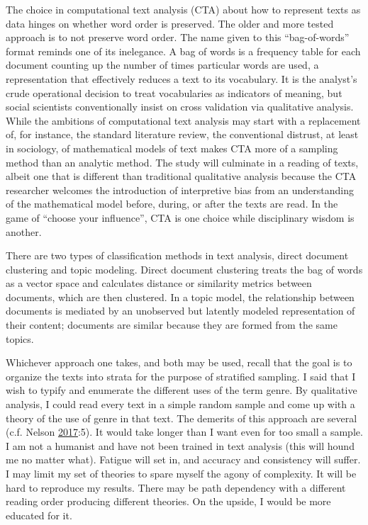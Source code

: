 \documentclass[]{book}
\theoremstyle{definition}
\theoremstyle{definition}
\theoremstyle{definition}
\theoremstyle{remark}
\begin{document}
The choice in computational text analysis (CTA) about how to represent
texts as data hinges on whether word order is preserved. The older and
more tested approach is to not preserve word order. The name given to
this ``bag-of-words'' format reminds one of its inelegance. A bag of
words is a frequency table for each document counting up the number of
times particular words are used, a representation that effectively
reduces a text to its vocabulary. It is the analyst's crude operational
decision to treat vocabularies as indicators of meaning, but social
scientists conventionally insist on cross validation via qualitative
analysis. While the ambitions of computational text analysis may start
with a replacement of, for instance, the standard literature review, the
conventional distrust, at least in sociology, of mathematical models of
text makes CTA more of a sampling method than an analytic method. The
study will culminate in a reading of texts, albeit one that is different
than traditional qualitative analysis because the CTA researcher
welcomes the introduction of interpretive bias from an understanding of
the mathematical model before, during, or after the texts are read. In
the game of ``choose your influence'', CTA is one choice while
disciplinary wisdom is another.

There are two types of classification methods in text analysis, direct
document clustering and topic modeling. Direct document clustering
treats the bag of words as a vector space and calculates distance or
similarity metrics between documents, which are then clustered. In a
topic model, the relationship between documents is mediated by an
unobserved but latently modeled representation of their content;
documents are similar because they are formed from the same topics.

Whichever approach one takes, and both may be used, recall that the goal
is to organize the texts into strata for the purpose of stratified
sampling. I said that I wish to typify and enumerate the different uses
of the term genre. By qualitative analysis, I could read every text in a
simple random sample and come up with a theory of the use of genre in
that text. The demerits of this approach are several (c.f. Nelson
\protect\hyperlink{ref-Nelson2017Computational}{2017}:5). It would take
longer than I want even for too small a sample. I am not a humanist and
have not been trained in text analysis (this will hound me no matter
what). Fatigue will set in, and accuracy and consistency will suffer. I
may limit my set of theories to spare myself the agony of complexity. It
will be hard to reproduce my results. There may be path dependency with
a different reading order producing different theories. On the upside, I
would be more educated for it.
\end{document}

